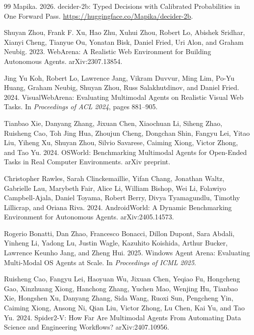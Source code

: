 \documentclass[11pt]{article}
\begin{document}
\begin{thebibliography}{99}
Mapika. 2026.
\newblock decider-2b: Typed Decisions with Calibrated Probabilities in One Forward Pass.
\newblock \url{https://huggingface.co/Mapika/decider-2b}.



Shuyan Zhou, Frank F. Xu, Hao Zhu, Xuhui Zhou, Robert Lo, Abishek Sridhar, Xianyi Cheng, Tianyue Ou, Yonatan Bisk, Daniel Fried, Uri Alon, and Graham Neubig. 2023.
\newblock WebArena: A Realistic Web Environment for Building Autonomous Agents.
\newblock arXiv:2307.13854.

Jing Yu Koh, Robert Lo, Lawrence Jang, Vikram Duvvur, Ming Lim, Po-Yu Huang, Graham Neubig, Shuyan Zhou, Russ Salakhutdinov, and Daniel Fried. 2024.
\newblock VisualWebArena: Evaluating Multimodal Agents on Realistic Visual Web Tasks.
\newblock In \emph{Proceedings of ACL 2024}, pages 881--905.

Tianbao Xie, Danyang Zhang, Jixuan Chen, Xiaochuan Li, Siheng Zhao, Ruisheng Cao, Toh Jing Hua, Zhoujun Cheng, Dongchan Shin, Fangyu Lei, Yitao Liu, Yiheng Xu, Shuyan Zhou, Silvio Savarese, Caiming Xiong, Victor Zhong, and Tao Yu. 2024.
\newblock OSWorld: Benchmarking Multimodal Agents for Open-Ended Tasks in Real Computer Environments.
\newblock arXiv preprint.

Christopher Rawles, Sarah Clinckemaillie, Yifan Chang, Jonathan Waltz, Gabrielle Lau, Marybeth Fair, Alice Li, William Bishop, Wei Li, Folawiyo Campbell-Ajala, Daniel Toyama, Robert Berry, Divya Tyamagundlu, Timothy Lillicrap, and Oriana Riva. 2024.
\newblock AndroidWorld: A Dynamic Benchmarking Environment for Autonomous Agents.
\newblock arXiv:2405.14573.

Rogerio Bonatti, Dan Zhao, Francesco Bonacci, Dillon Dupont, Sara Abdali, Yinheng Li, Yadong Lu, Justin Wagle, Kazuhito Koishida, Arthur Bucker, Lawrence Keunho Jang, and Zheng Hui. 2025.
\newblock Windows Agent Arena: Evaluating Multi-Modal OS Agents at Scale.
\newblock In \emph{Proceedings of ICML 2025}.

Ruisheng Cao, Fangyu Lei, Haoyuan Wu, Jixuan Chen, Yeqiao Fu, Hongcheng Gao, Xinzhuang Xiong, Hanchong Zhang, Yuchen Mao, Wenjing Hu, Tianbao Xie, Hongshen Xu, Danyang Zhang, Sida Wang, Ruoxi Sun, Pengcheng Yin, Caiming Xiong, Ansong Ni, Qian Liu, Victor Zhong, Lu Chen, Kai Yu, and Tao Yu. 2024.
\newblock Spider2-V: How Far Are Multimodal Agents From Automating Data Science and Engineering Workflows?
\newblock arXiv:2407.10956.


\end{thebibliography}
\end{document}
